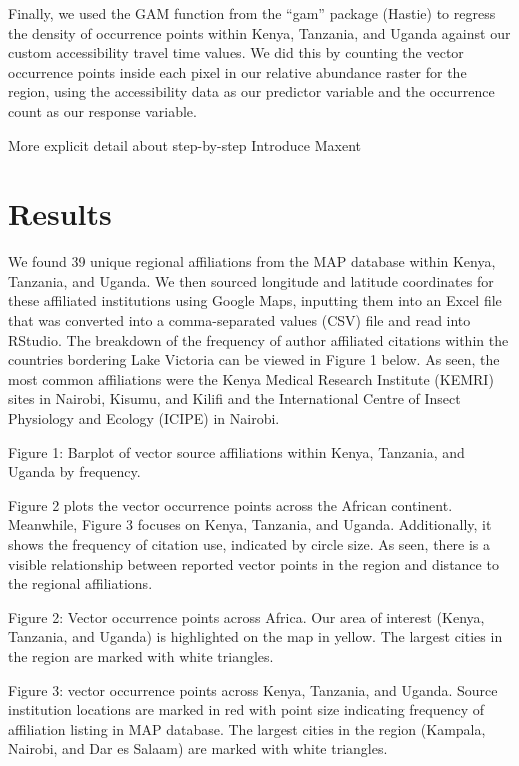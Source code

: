 \documentclass[sn-nature]{sn-jnl}%
\begin{document}
Finally, we used the GAM function from the “gam” package (Hastie) to regress the density of occurrence points within Kenya, Tanzania, and Uganda against our custom accessibility travel time values. We did this by counting the vector occurrence points inside each pixel in our relative abundance raster for the region, using the accessibility data as our predictor variable and the occurrence count as our response variable. 

More explicit detail about step-by-step
Introduce Maxent


\section*{Results}\label{results}
We found 39 unique regional affiliations from the MAP database within Kenya, Tanzania, and Uganda. We then sourced longitude and latitude coordinates for these affiliated institutions using Google Maps, inputting them into an Excel file that was converted into a comma-separated values (CSV) file and read into RStudio. The breakdown of the frequency of author affiliated citations within the countries bordering Lake Victoria can be viewed in Figure 1 below. As seen, the most common affiliations were the Kenya Medical Research Institute (KEMRI) sites in Nairobi, Kisumu, and Kilifi and the International Centre of Insect Physiology and Ecology (ICIPE) in Nairobi. 


Figure 1: Barplot of vector source affiliations within Kenya, Tanzania, and Uganda by frequency. 

Figure 2 plots the vector occurrence points across the African continent. Meanwhile, Figure 3 focuses on Kenya, Tanzania, and Uganda. Additionally, it shows the frequency of citation use, indicated by circle size. As seen, there is a visible relationship between reported vector points in the region and distance to the regional affiliations.  



Figure 2: Vector occurrence points across Africa. Our area of interest (Kenya, Tanzania, and Uganda) is highlighted on the map in yellow. The largest cities in the region are marked with white triangles. 



Figure 3: vector occurrence points across Kenya, Tanzania, and Uganda. Source institution locations are marked in red with point size indicating frequency of affiliation listing in MAP database. The largest cities in the region (Kampala, Nairobi, and Dar es Salaam) are marked with white triangles. 
\end{document}
